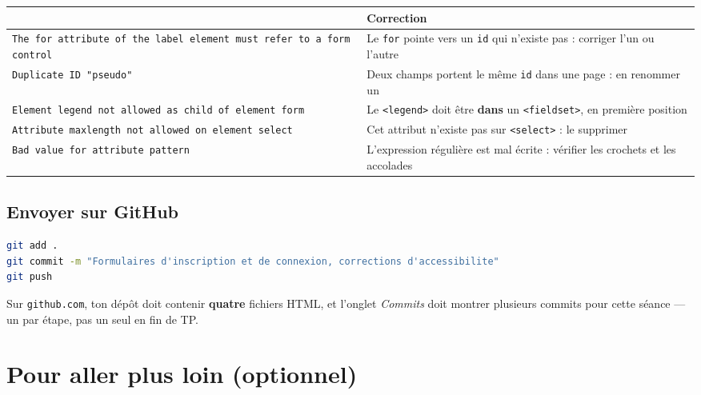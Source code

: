 \documentclass[a4paper,11pt]{article}
\newcommand{\hdr}[1]{\multicolumn{1}{l}{\color{white}\bfseries #1}}
\renewcommand{\arraystretch}{1.3}
\begin{document}
\begin{center}
\renewcommand{\arraystretch}{1.0}
\begin{tabularx}{\linewidth}{p{6.1cm}X}
  \toprule
  \rowcolor{uniNavy}
  \hdr{Message fréquent cette semaine} & \hdr{Correction} \\
  \midrule
  \rowcolor{uniPaper}
  \texttt{The for attribute of the label element must refer to a form control} & Le \texttt{for} pointe vers un \texttt{id} qui n'existe pas : corriger l'un ou l'autre \\
  \texttt{Duplicate ID "pseudo"} & Deux champs portent le même \texttt{id} dans une page : en renommer un \\
  \rowcolor{uniPaper}
  \texttt{Element legend not allowed as child of element form} & Le \texttt{<legend>} doit être \textbf{dans} un \texttt{<fieldset>}, en première position \\
  \texttt{Attribute maxlength not allowed on element select} & Cet attribut n'existe pas sur \texttt{<select>} : le supprimer \\
  \rowcolor{uniPaper}
  \texttt{Bad value for attribute pattern} & L'expression régulière est mal écrite : vérifier les crochets et les accolades \\
  \bottomrule
\end{tabularx}
\end{center}

\subsection{Envoyer sur GitHub}

\begin{lstlisting}[language=bash, numbers=none]
git add .
git commit -m "Formulaires d'inscription et de connexion, corrections d'accessibilite"
git push
\end{lstlisting}

\begin{tcolorbox}[astuce, title={Vérifier que c'est bien parti}]
Sur \texttt{github.com}, ton dépôt doit contenir \textbf{quatre} fichiers HTML, et l'onglet \textit{Commits} doit montrer plusieurs commits pour cette séance --- un par étape, pas un seul en fin de TP.
\end{tcolorbox}

\section{Pour aller plus loin (optionnel)}
\end{document}
